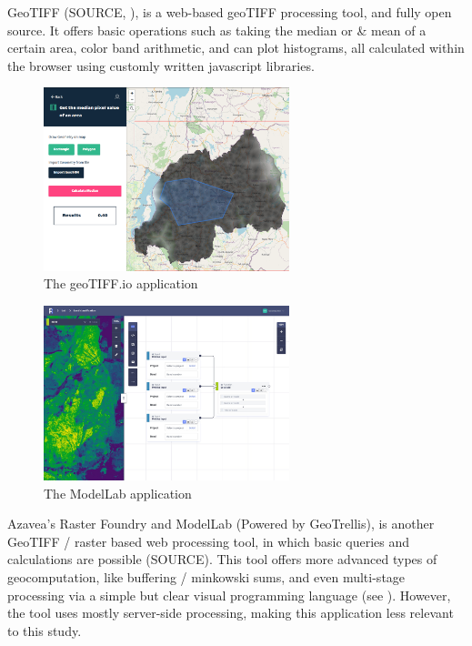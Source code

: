 GeoTIFF (SOURCE, ), is a web-based geoTIFF processing tool, and fully open source. 
It offers basic operations such as taking the median or \& mean of a certain area, color band arithmetic, and can plot histograms, all calculated within the browser using customly written javascript libraries.

\begin{figure}
  \centering
  \graphicspath{ {../../assets/images/background/geo-web/} }
  \includegraphics[width=270px]{geotiff.png}
  \caption{The geoTIFF.io application}
  \label{fig:geotiff}
\end{figure}


\begin{figure}
  \centering
  \graphicspath{ {../../assets/images/background/geo-web/} }
  \includegraphics[width=270px]{rasterfoundry-2.jpg}
  \caption{The ModelLab application}
  \label{fig:modellab}
\end{figure}

Azavea's Raster Foundry and ModelLab (Powered by GeoTrellis), is another GeoTIFF / raster based web processing tool, in which basic queries and calculations are possible (SOURCE). 
This tool offers more advanced types of geocomputation, like buffering / minkowski sums, and even multi-stage processing via a simple but clear visual programming language (see ). 
However, the tool uses mostly server-side processing, making this application less relevant to this study. 


